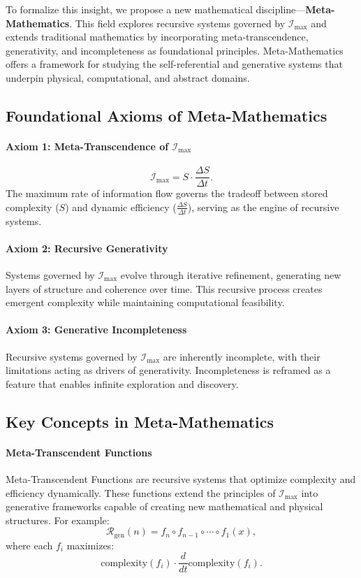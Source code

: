 \documentclass[12pt]{article}
\begin{document}
To formalize this insight, we propose a new mathematical discipline—\textbf{Meta-Mathematics}. This field explores recursive systems governed by \( \mathcal{I}_{\text{max}} \) and extends traditional mathematics by incorporating meta-transcendence, generativity, and incompleteness as foundational principles. Meta-Mathematics offers a framework for studying the self-referential and generative systems that underpin physical, computational, and abstract domains.


\subsection{Foundational Axioms of Meta-Mathematics}

\paragraph{Axiom 1: Meta-Transcendence of \(\mathcal{I}_{\text{max}}\)}
\[
\mathcal{I}_{\text{max}} = S \cdot \frac{\Delta S}{\Delta t}.
\]
The maximum rate of information flow governs the tradeoff between stored complexity (\(S\)) and dynamic efficiency (\(\frac{\Delta S}{\Delta t}\)), serving as the engine of recursive systems.

\paragraph{Axiom 2: Recursive Generativity}
Systems governed by \(\mathcal{I}_{\text{max}}\) evolve through iterative refinement, generating new layers of structure and coherence over time. This recursive process creates emergent complexity while maintaining computational feasibility.

\paragraph{Axiom 3: Generative Incompleteness}
Recursive systems governed by \(\mathcal{I}_{\text{max}}\) are inherently incomplete, with their limitations acting as drivers of generativity. Incompleteness is reframed as a feature that enables infinite exploration and discovery.


\subsection{Key Concepts in Meta-Mathematics}

\paragraph{Meta-Transcendent Functions}
Meta-Transcendent Functions are recursive systems that optimize complexity and efficiency dynamically. These functions extend the principles of \( \mathcal{I}_{\text{max}} \) into generative frameworks capable of creating new mathematical and physical structures. For example:
\[
\mathcal{R}_{\text{gen}}(n) = f_n \circ f_{n-1} \circ \cdots \circ f_1(x),
\]
where each \(f_i\) maximizes:
\[
\text{complexity}(f_i) \cdot \frac{d}{dt} \text{complexity}(f_i).
\]
\end{document}

